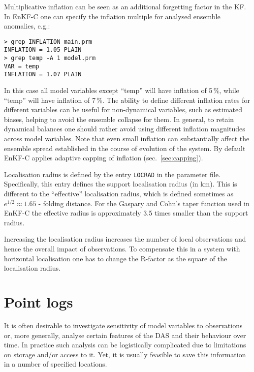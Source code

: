 \documentclass[11pt]{report}
\begin{document}
Multiplicative inflation can be seen as an additional forgetting factor in the KF.
In EnKF-C one can specify the inflation multiple for analysed ensemble anomalies, e.g.:
\begin{Verbatim}[frame=single,fontsize=\footnotesize]
> grep INFLATION main.prm
INFLATION = 1.05 PLAIN
> grep temp -A 1 model.prm
VAR = temp
INFLATION = 1.07 PLAIN
\end{Verbatim}
In this case all model variables except ``temp'' will have inflation of 5\,\%, while ``temp'' will have inflation of 7\,\%.
The ability to define different inflation rates for different variables can be useful for non-dynamical variables, such as estimated biases, helping to avoid the ensemble collapse for them.
In general, to retain dynamical balances one should rather avoid using different inflation magnitudes across model variables.
Note that even small inflation can substantially affect the ensemble spread established in the course of evolution of the system.
By default EnKF-C applies adaptive capping of inflation (sec.~\ref{sec:capping}).

Localisation radius is defined by the entry \verb|LOCRAD| in the parameter file.
Specifically, this entry defines the support localisation radius (in km).
This is different to the ``effective'' localisation radius, which is defined sometimes as $e^{1/2}\approx 1.65$ - folding distance.
For the Gaspary and Cohn's taper function used in EnKF-C the effective radius is approximately 3.5 times smaller than the support radius.

Increasing the localisation radius increases the number of local observations and hence the overall impact of observations.
To compensate this in a system with horizontal localisation one has to change the R-factor as the square of the localisation radius.

\section{Point logs}
\label{sec:pointlogs}

It is often desirable to investigate sensitivity of model variables to observations or, more generally,  analyse certain features of the DAS and their behaviour over time.
In practice such analysis can be logistically complicated due to limitations on storage and/or access to it.
Yet, it is usually feasible to save this information in a number of specified locations.
\end{document}
